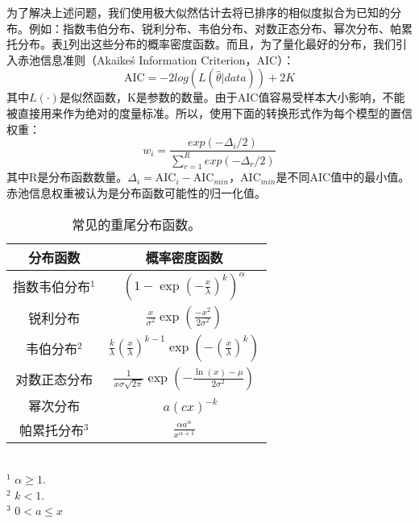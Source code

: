 为了解决上述问题，我们使用极大似然估计去将已排序的相似度拟合为已知的分布。例如：指数韦伯分布、锐利分布、韦伯分布、对数正态分布、幂次分布、帕累托分布。表\ref{tab:PDF}列出这些分布的概率密度函数。而且，为了量化最好的分布，我们引入赤池信息准则（Akaike\'s Information Criterion，AIC）\citep{burnham2004multimodel}：
\begin{equation}\label{eq:AIC}
 \text{AIC} = -2log(L(\hat{\theta}|data)) + 2K
\end{equation}
其中$L(\cdot)$是似然函数，K是参数的数量。由于AIC值容易受样本大小影响\citep{rhee2011levywalk}，不能被直接用来作为绝对的度量标准。所以，使用下面的转换形式作为每个模型的置信权重\citep{burnham2004multimodel}：
\begin{equation}\label{eq:AICweight}
    w_i = \frac{exp(-\Delta_i/2)}{\sum_{r=1}^{R}exp(-\Delta_r/2)}
\end{equation}
其中R是分布函数数量。$\Delta_i=\text{AIC}_i-\text{AIC}_{min}$，$\text{AIC}_{min}$是不同AIC值中的最小值。赤池信息权重被认为是分布函数可能性的归一化值。
\begin{table}[!htbp]
    \caption{常见的重尾分布函数。}
    \label{tab:PDF}
    \centering
    \setlength{\tabcolsep}{4pt}%
    \renewcommand{\arraystretch}{1.2}%
    \begin{tabular}{|c|c|}
        \hline
        分布函数 & 概率密度函数\\
        \hline\hline
        指数韦伯分布$^1$ & $(1-\exp(-\frac{x}{\lambda})^k)^{\alpha}$\\
        \hline
        锐利分布 & $\frac{x}{\sigma^2}\exp(\frac{-x^2}{2\sigma^2})$\\
        \hline
        韦伯分布$^2$ & $\frac{k}{\lambda}(\frac{x}{\lambda})^{k-1}\exp(-(\frac{x}{\lambda})^k)$\\
        \hline
        对数正态分布 & $\frac{1}{x\sigma\sqrt{2\pi}}\exp(-\frac{\ln(x)-\mu}{2\sigma^2})$\\
        \hline
        幂次分布　&　$a(cx)^{-k}$\\
        \hline
        帕累托分布$^3$　& $\frac{\alpha a^{\alpha}}{x^{\alpha+1}}$\\
        \hline
    \end{tabular}\\
    \footnotesize{$^1$ $\alpha \geq 1.$}\\
    \footnotesize{$^2$ $k < 1.$}\\
    \footnotesize{$^3$ $0 < a \leq x$}\\
\end{table}


